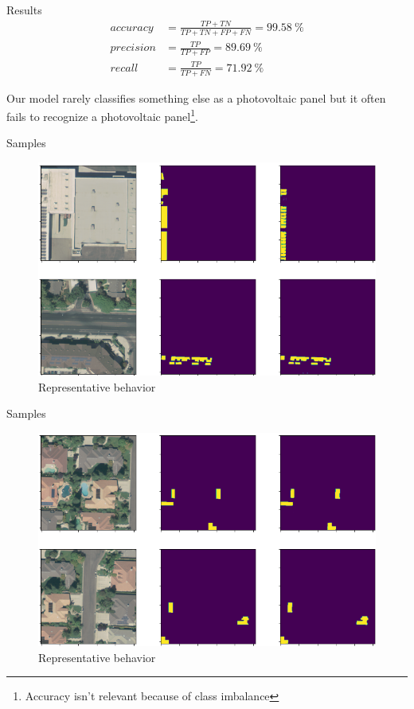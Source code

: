\documentclass[12pt]{beamer}
\begin{document}
\begin{frame}{Results}
    \begin{align*}
        accuracy & = \frac{TP + TN}{TP + TN + FP + FN} =  \SI{99.58}{\percent} \\
        precision & = \frac{TP}{TP + FP} = \SI{89.69}{\percent} \\
        recall & = \frac{TP}{TP + FN} = \SI{71.92}{\percent}
    \end{align*}
    
    Our model rarely classifies something else as a photovoltaic panel but it often fails to recognize a photovoltaic panel\footnote{Accuracy isn't relevant because of class imbalance}.
\end{frame}

\begin{frame}{Samples}
    \begin{figure}
        \centering
        \includegraphics[width=\textwidth]{resources/png/representative_0_crop.png}
        \caption{Representative behavior}
    \end{figure}
\end{frame}

\begin{frame}{Samples}
    \begin{figure}
        \centering
        \includegraphics[width=\textwidth]{resources/png/representative_1_crop.png}
        \caption{Representative behavior}
    \end{figure}
\end{frame}
\end{document}
